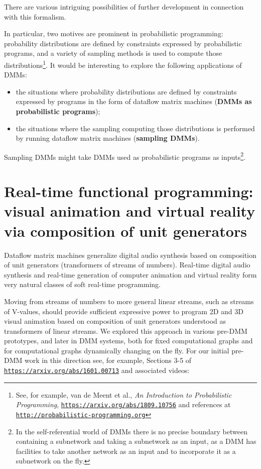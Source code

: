 \documentclass{article}
\begin{document}
There are various intriguing possibilities of further development in connection with this formalism.

In particular, two motives are prominent in probabilistic programming: probability distributions are defined
by constraints expressed by probabilistic programs, and a variety of sampling methods is used
to compute those distributions\footnote{See, for example, van  de Meent et al., {\em An Introduction to Probabilistic Programming}, 
\href{https://arxiv.org/abs/1809.10756}{\tt https://arxiv.org/abs/1809.10756} and references at \href{http://probabilistic-programming.org}{\tt http://probabilistic-programming.org} }.
It would be interesting to explore the following applications of DMMs:
  \begin{itemize}
      \item the situations where probability distributions are defined by
constraints expressed by programs in the form of dataflow matrix machines ({\bf DMMs as probabilistic programs});
     \item the situations where the sampling
computing those distributions is performed by running dataflow matrix machines ({\bf sampling DMMs}).
  \end{itemize}
Sampling DMMs might take  DMMs  used as probabilistic programs as inputs\footnote{In 
the self-referential world of DMMs there is no precise boundary between containing a subnetwork and taking a subnetwork as an input, as a DMM has facilities
to take another network as an input and to incorporate it as a subnetwork on the fly.}.


\section{Real-time functional programming: visual animation and virtual reality via composition
of unit generators}

Dataflow matrix machines generalize digital audio synthesis based on composition of unit generators
(transformers of streams of numbers). Real-time digital audio synthesis and real-time generation
of computer animation and virtual reality form very natural classes of soft real-time programming.

Moving from streams of numbers to more general linear streams, such as streams of V-values,
should provide sufficient expressive power to program 2D and 3D visual animation based on
composition of unit generators understood as transformers of linear streams. We explored
this approach in various pre-DMM prototypes, and later in DMM systems, both for fixed
computational graphs and for computational graphs dynamically changing on the fly.
For our initial pre-DMM work in this direction see, for example, Sections 3-5 of \href{https://arxiv.org/abs/1601.00713}{\tt https://arxiv.org/abs/1601.00713} and associated videos:
\end{document}
